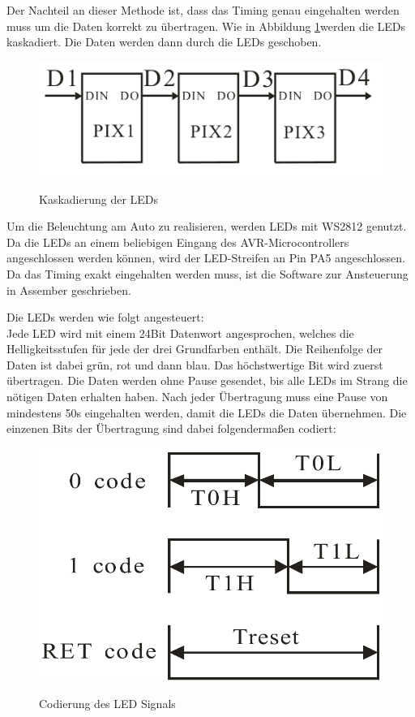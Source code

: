 Der Nachteil an dieser Methode ist, dass das Timing genau eingehalten werden muss um die Daten korrekt zu übertragen. Wie in Abbildung \ref{fig:led_cascade}werden die LEDs kaskadiert. Die Daten werden dann durch die LEDs geschoben.

\begin{figure}[H]
\centering
\includegraphics[width=.8\textwidth]{led_cascade.png}\\
\caption{Kaskadierung der LEDs}%
\label{fig:led_cascade}
\end{figure}

Um die Beleuchtung am Auto zu realisieren, werden LEDs mit WS2812 genutzt. Da die LEDs an einem beliebigen
Eingang des AVR-Microcontrollers angeschlossen werden können, wird der LED-Streifen an Pin PA5 angeschlossen. Da das Timing 
exakt eingehalten werden muss, ist die Software zur Ansteuerung in Assember geschrieben.

Die LEDs werden wie folgt angesteuert:\\
Jede LED wird mit einem 24Bit Datenwort angesprochen, welches die Helligkeitsstufen für jede der drei Grundfarben enthält. 
Die Reihenfolge der Daten ist dabei grün, rot und dann blau. Das höchstwertige Bit wird zuerst übertragen.
Die Daten werden ohne Pause gesendet, bis alle LEDs im Strang die nötigen Daten erhalten haben. Nach jeder Übertragung muss eine Pause von mindestens 50\textmu s eingehalten
werden, damit die LEDs die Daten übernehmen. Die einzenen Bits der Übertragung sind dabei folgendermaßen codiert:

\begin{figure}[H]
\centering
\includegraphics[width=.5\textwidth]{led_timing.png}\\
\caption{Codierung des LED Signals}%
\label{fig:led_timing}
\end{figure}

